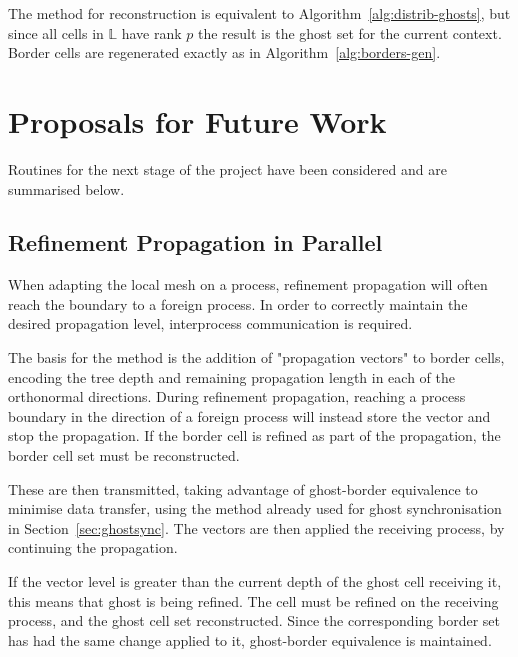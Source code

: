 \documentclass[twoside]{IIBproject}
\numberwithin{figure}{section}
\begin{document}
            The method for reconstruction is equivalent to Algorithm~\ref{alg:distrib-ghosts}, but since all cells in $\mathbb{L}$ have rank $p$ the result is the ghost set for the current context. Border cells are regenerated exactly as in Algorithm~\ref{alg:borders-gen}.





\section{Proposals for Future Work} %
    \label{sec:future-work}

    Routines for the next stage of the project have been considered and are summarised below. 

    \subsection{Refinement Propagation in Parallel} %
        \label{sec:parprop}

        When adapting the local mesh on a process, refinement propagation will often reach the boundary to a foreign process. In order to correctly maintain the desired propagation level, interprocess communication is required. 

        The basis for the method is the addition of "propagation vectors" to border cells, encoding the tree depth and remaining propagation length in each of the orthonormal directions. During refinement propagation, reaching a process boundary in the direction of a foreign process will instead store the vector and stop the propagation. If the border cell is refined as part of the propagation, the border cell set must be reconstructed. 

        These are then transmitted, taking advantage of ghost-border equivalence to minimise data transfer, using the method already used for ghost synchronisation in Section~\ref{sec:ghostsync}. The vectors are then applied the receiving process, by continuing the propagation. 

        If the vector level is greater than the current depth of the ghost cell receiving it, this means that ghost is being refined. The cell must be refined on the receiving process, and the ghost cell set reconstructed. Since the corresponding border set has had the same change applied to it, ghost-border equivalence is maintained. 
\end{document}
